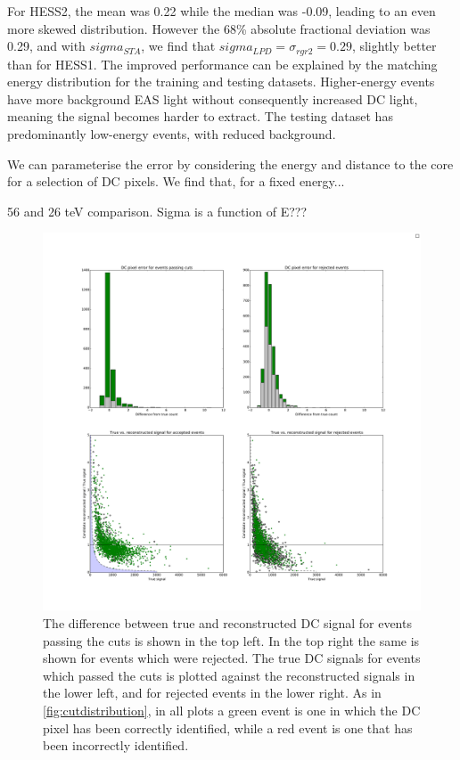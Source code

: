 \documentclass{article}
\begin{document}
For HESS2, the mean was 0.22 while the median was -0.09, leading to an even more skewed distribution. However the 68\% absolute fractional deviation was 0.29, and with $sigma_{STA}$, we find that $sigma_{LPD}=\sigma_{rgr2}=0.29$, slightly better than for HESS1. The improved performance can be explained by the matching energy distribution for the training and testing datasets. Higher-energy events have more background EAS light without consequently increased DC light, meaning the signal becomes harder to extract. The testing dataset has predominantly low-energy events, with reduced background.

We can parameterise the error by considering the energy and distance to the core for a selection of DC pixels. We find that, for a fixed energy...

56 and 26 teV comparison. Sigma is a function of E???


\begin{figure}
\begin{center}
\includegraphics[width=\textwidth]{DCcounterrorhess1rgr}
\caption{The difference between true and reconstructed DC signal for events passing the cuts is shown in the top left. In the top right the same is shown for events which were rejected. The true DC signals for events which passed the cuts is plotted against the reconstructed signals in the lower left, and for rejected events in the lower right. As in \ref{fig:cutdistribution}, in all plots a green event is one in which the DC pixel has been correctly identified, while a red event is one that has been incorrectly identified.}
\label{fig:dcdiff}
\end{center}
\end{figure}
\end{document}
